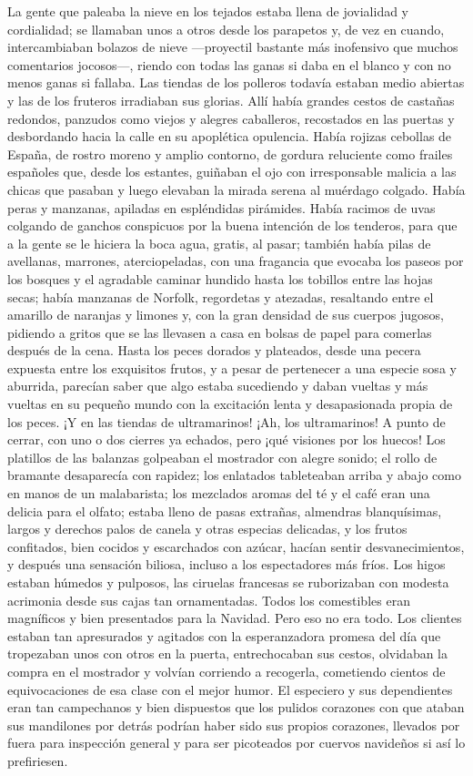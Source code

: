 \documentclass{novela}
\begin{document}
 La gente que paleaba la nieve en los tejados estaba llena de jovialidad y cordialidad; se llamaban unos a otros desde los parapetos y, de vez en cuando, intercambiaban bolazos de nieve ---proyectil bastante más inofensivo que muchos comentarios jocosos---, riendo con todas las ganas si daba en el blanco y con no menos ganas si fallaba. Las tiendas de los polleros todavía estaban medio abiertas y las de los fruteros irradiaban sus glorias. Allí había grandes cestos de castañas redondos, panzudos como viejos y alegres caballeros, recostados en las puertas y desbordando hacia la calle en su apoplética opulencia. Había rojizas cebollas de España, de rostro moreno y amplio contorno, de gordura reluciente como frailes españoles que, desde los estantes, guiñaban el ojo con irresponsable malicia a las chicas que pasaban y luego elevaban la mirada serena al muérdago colgado. Había peras y manzanas, apiladas en espléndidas pirámides. Había racimos de uvas colgando de ganchos conspicuos por la buena intención de los tenderos, para que a la gente se le hiciera la boca agua, gratis, al pasar; también había pilas de avellanas, marrones, aterciopeladas, con una fragancia que evocaba los paseos por los bosques y el agradable caminar hundido hasta los tobillos entre las hojas secas; había manzanas de Norfolk, regordetas y atezadas, resaltando entre el amarillo de naranjas y limones y, con la gran densidad de sus cuerpos jugosos, pidiendo a gritos que se las llevasen a casa en bolsas de papel para comerlas después de la cena. Hasta los peces dorados y plateados, desde una pecera expuesta entre los exquisitos frutos, y a pesar de pertenecer a una especie sosa y aburrida, parecían saber que algo estaba sucediendo y daban vueltas y más vueltas en su pequeño mundo con la excitación lenta y desapasionada propia de los peces. ¡Y en las tiendas de ultramarinos! ¡Ah, los ultramarinos! A punto de cerrar, con uno o dos cierres ya echados, pero ¡qué visiones por los huecos! Los platillos de las balanzas golpeaban el mostrador con alegre sonido; el rollo de bramante desaparecía con rapidez; los enlatados tableteaban arriba y abajo como en manos de un malabarista; los mezclados aromas del té y el café eran una delicia para el olfato; estaba lleno de pasas extrañas, almendras blanquísimas, largos y derechos palos de canela y otras especias delicadas, y los frutos confitados, bien cocidos y escarchados con azúcar, hacían sentir desvanecimientos, y después una sensación biliosa, incluso a los espectadores más fríos. Los higos estaban húmedos y pulposos, las ciruelas francesas se ruborizaban con modesta acrimonia desde sus cajas tan ornamentadas. Todos los comestibles eran magníficos y bien presentados para la Navidad. Pero eso no era todo. Los clientes estaban tan apresurados y agitados con la esperanzadora promesa del día que tropezaban unos con otros en la puerta, entrechocaban sus cestos, olvidaban la compra en el mostrador y volvían corriendo a recogerla, cometiendo cientos de equivocaciones de esa clase con el mejor humor. El especiero y sus dependientes eran tan campechanos y bien dispuestos que los pulidos corazones con que ataban sus mandilones por detrás podrían haber sido sus propios corazones, llevados por fuera para inspección general y para ser picoteados por cuervos navideños si así lo prefiriesen.
\end{document}
